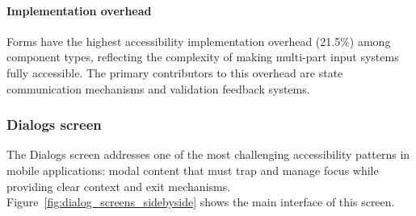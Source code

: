 \paragraph{Implementation overhead}

Forms have the highest accessibility implementation overhead (21.5\%) among component types, reflecting the complexity of making multi-part input systems fully accessible. The primary contributors to this overhead are state communication mechanisms and validation feedback systems.

\subsubsection{Dialogs screen}
\label{subsubsec:dialogs-screen}

The Dialogs screen addresses one of the most challenging accessibility patterns in mobile applications: modal content that must trap and manage focus while providing clear context and exit mechanisms. Figure~\ref{fig:dialog_screens_sidebyside} shows the main interface of this screen.

